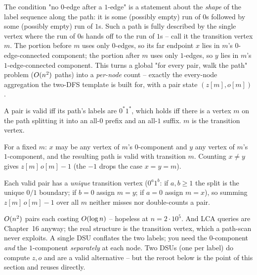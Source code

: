 The condition "no $0$-edge after a $1$-edge" is a statement about the
\emph{shape} of the label sequence along the path: it is some (possibly empty)
run of $0$s followed by some (possibly empty) run of $1$s. Such a path is fully
described by the single vertex where the run of $0$s hands off to the run of
$1$s -- call it the transition vertex $m$. The portion before $m$ uses only
$0$-edges, so its far endpoint $x$ lies in $m$'s $0$-edge-connected component;
the portion after $m$ uses only $1$-edges, so $y$ lies in $m$'s
$1$-edge-connected component. This turns a global "for every pair, walk the
path" problem ($O(n^2)$ paths) into a \emph{per-node} count -- exactly the
every-node aggregation the two-DFS template is built for, with a pair state
$(z[m],o[m])$.

\begin{observation}
A pair is valid iff its path's labels are $0^{\ast}1^{\ast}$, which holds iff
there is a vertex $m$ on the path splitting it into an all-$0$ prefix and an
all-$1$ suffix. $m$ is the transition vertex.
\end{observation}
\begin{observation}
For a fixed $m$: $x$ may be any vertex of $m$'s $0$-component and $y$ any
vertex of $m$'s $1$-component, and the resulting path is valid with transition
$m$. Counting $x\ne y$ gives $z[m]\,o[m]-1$ (the $-1$ drops the case $x=y=m$).
\end{observation}
\begin{observation}
Each valid pair has a \emph{unique} transition vertex ($0^{a}1^{b}$: if
$a,b\ge1$ the split is the unique $0/1$ boundary; if $b=0$ assign $m=y$; if
$a=0$ assign $m=x$), so summing $z[m]\,o[m]-1$ over all $m$ neither misses nor
double-counts a pair.
\end{observation}

\begin{thinkbox}
{$O(n^2)$ pairs each costing $O(\log n)$ -- hopeless at $n=2\cdot10^{5}$.
And LCA queries are Chapter~16 anyway; the real structure is the transition
vertex, which a path-scan never exploits.}
{A single DSU conflates the two labels; you need the $0$-component \emph{and}
the $1$-component \emph{separately} at each node. Two DSUs (one per label) do
compute $z,o$ and are a valid alternative -- but the reroot below is the point
of this section and reuses  directly.}
\end{thinkbox}

